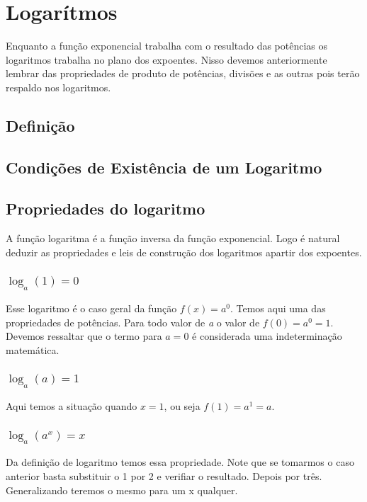\chapter{Logarítmos}

Enquanto a função exponencial trabalha com o resultado das potências os logaritmos trabalha no plano dos expoentes. Nisso devemos anteriormente lembrar das propriedades de produto de potências, divisões e as outras pois terão respaldo nos logaritmos.

\section{Definição}
\section{Condições de Existência de um Logaritmo}
\section{Propriedades do logaritmo}

A função logaritma é a função inversa da função exponencial. Logo é natural deduzir as propriedades e leis de construção dos logaritmos apartir dos expoentes. 

\subsection{$\log_a (1)=0$}

Esse logaritmo é o caso geral da função $f(x)=a^0$. Temos aqui uma das propriedades de potências. Para todo valor de \textit{a} o valor de $f(0)=a^0=1$. Devemos ressaltar que o termo para $a=0$ é considerada uma indeterminação matemática.

\subsection{$\log_a (a)=1$}

Aqui temos a situação quando $x=1$, ou seja $f(1)=a^1=a$.

\subsection{$\log_a (a^x)=x$}

Da definição de logaritmo temos essa propriedade. Note que se tomarmos o caso anterior basta substituir o 1 por 2 e verifiar o resultado. Depois por três. Generalizando teremos o mesmo para um x qualquer.

